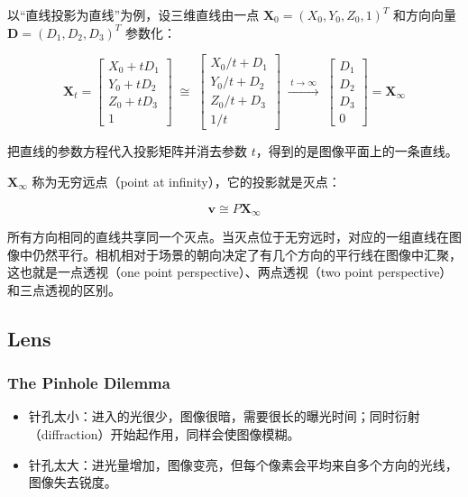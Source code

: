 以“直线投影为直线”为例，设三维直线由一点 $\boldsymbol{X}_0 = (X_0,Y_0,Z_0,1)^T$ 和方向向量 $\boldsymbol{D} = (D_1,D_2,D_3)^T$ 参数化：

\[
\boldsymbol{X}_t = \begin{bmatrix} X_0 + tD_1 \\ Y_0 + tD_2 \\ Z_0 + tD_3 \\ 1 \end{bmatrix}
\;\cong\; \begin{bmatrix} X_0/t + D_1 \\ Y_0/t + D_2 \\ Z_0/t + D_3 \\ 1/t \end{bmatrix}
\;\xrightarrow{\;t\to\infty\;}\; \begin{bmatrix} D_1 \\ D_2 \\ D_3 \\ 0 \end{bmatrix} = \boldsymbol{X}_\infty
\]

把直线的参数方程代入投影矩阵并消去参数 $t$，得到的是图像平面上的一条直线。

$\boldsymbol{X}_\infty$ 称为无穷远点（point at infinity），它的投影就是灭点：

\[
\boldsymbol{v} \cong P\boldsymbol{X}_\infty
\]

所有方向相同的直线共享同一个灭点。当灭点位于无穷远时，对应的一组直线在图像中仍然平行。相机相对于场景的朝向决定了有几个方向的平行线在图像中汇聚，这也就是一点透视（one point perspective）、两点透视（two point perspective）和三点透视的区别。

\subsection{Lens}

\subsubsection{The Pinhole Dilemma}

\begin{itemize}
    \item 针孔太小：进入的光很少，图像很暗，需要很长的曝光时间；同时衍射（diffraction）开始起作用，同样会使图像模糊。
    \item 针孔太大：进光量增加，图像变亮，但每个像素会平均来自多个方向的光线，图像失去锐度。
\end{itemize}

